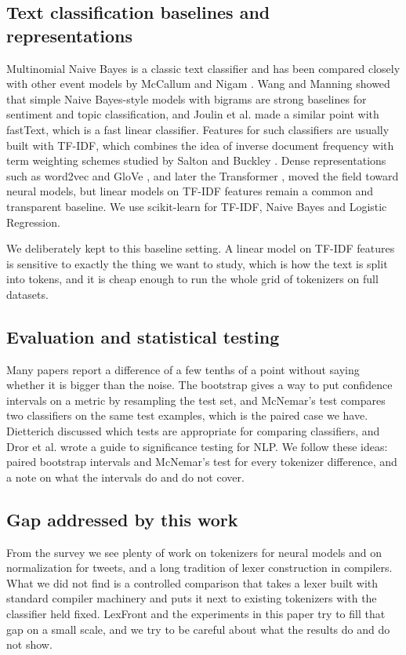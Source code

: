 \documentclass{ieeeaccess}
\begin{document}
\subsection{Text classification baselines and representations}\label{sec:2.4}
Multinomial Naive Bayes is a classic text classifier and has been compared closely with other event models by McCallum and Nigam \cite{r27}. Wang and Manning \cite{r28} showed that simple Naive Bayes-style models with bigrams are strong baselines for sentiment and topic classification, and Joulin et al. \cite{r29} made a similar point with fastText, which is a fast linear classifier. Features for such classifiers are usually built with TF-IDF, which combines the idea of inverse document frequency \cite{r30} with term weighting schemes studied by Salton and Buckley \cite{r31}. Dense representations such as word2vec \cite{r32} and GloVe \cite{r33}, and later the Transformer \cite{r34}, moved the field toward neural models, but linear models on TF-IDF features remain a common and transparent baseline. We use scikit-learn \cite{r35} for TF-IDF, Naive Bayes and Logistic Regression.

We deliberately kept to this baseline setting. A linear model on TF-IDF features is sensitive to exactly the thing we want to study, which is how the text is split into tokens, and it is cheap enough to run the whole grid of tokenizers on full datasets.

\subsection{Evaluation and statistical testing}\label{sec:2.5}
Many papers report a difference of a few tenths of a point without saying whether it is bigger than the noise. The bootstrap \cite{r36} gives a way to put confidence intervals on a metric by resampling the test set, and McNemar's test \cite{r37} compares two classifiers on the same test examples, which is the paired case we have. Dietterich \cite{r38} discussed which tests are appropriate for comparing classifiers, and Dror et al. \cite{r39} wrote a guide to significance testing for NLP. We follow these ideas: paired bootstrap intervals and McNemar's test for every tokenizer difference, and a note on what the intervals do and do not cover.

\subsection{Gap addressed by this work}\label{sec:2.6}
From the survey we see plenty of work on tokenizers for neural models and on normalization for tweets, and a long tradition of lexer construction in compilers. What we did not find is a controlled comparison that takes a lexer built with standard compiler machinery and puts it next to existing tokenizers with the classifier held fixed. LexFront and the experiments in this paper try to fill that gap on a small scale, and we try to be careful about what the results do and do not show.
\end{document}
